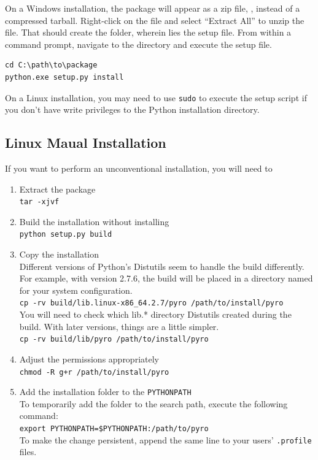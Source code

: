 On a Windows installation, the package will appear as a zip file, \texttt{\wpackage{}}, instead of a compressed tarball.  Right-click on the file and select ``Extract All'' to unzip the file.  That should create the \texttt{\package} folder, wherein lies the setup file.  From within a command prompt, navigate to the directory and execute the setup file.
\begin{verbatim}
cd C:\path\to\package
python.exe setup.py install
\end{verbatim}

On a Linux installation, you may need to use \verb|sudo| to execute the setup script if you don't have write privileges to the Python installation directory.

\subsection{Linux Maual Installation}
If you want to perform an unconventional installation, you will need to
\begin{enumerate}
\item Extract the package\\
\texttt{tar -xjvf \lpackage}
\item Build the installation without installing\\
\texttt{python setup.py build}\\
\item Copy the installation\\
Different versions of Python's Distutils seem to handle the build differently.  For example, with version 2.7.6, the build will be placed in a directory named for your system configuration.\\
\verb|cp -rv build/lib.linux-x86_64.2.7/pyro /path/to/install/pyro|\\
You will need to check which lib.* directory Distutils created during the build.  With later versions, things are a little simpler.\\
\texttt{cp -rv build/lib/pyro /path/to/install/pyro}
\item Adjust the permissions appropriately\\
\texttt{chmod -R g+r /path/to/install/pyro}
\item Add the installation folder to the \verb|PYTHONPATH|\\
To temporarily add the folder to the search path, execute the following command:\\
\texttt{export PYTHONPATH=\${PYTHONPATH}:/path/to/pyro}\\
To make the change persistent, append the same line to your users' \verb|.profile| files.
\end{enumerate}

